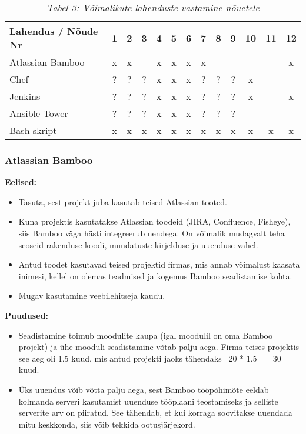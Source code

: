 \documentclass[12pt]{report}
\begin{document}
  \begin{table}
    \begin{tabular}{ |l|c|c|c|c|c|c|c|c|c|c|c|c| }
      \hline
      \textbf{Lahendus / Nõude Nr} & \textbf{1} & \textbf{2} & \textbf{3} & \textbf{4} & \textbf{5} & \textbf{6} & \textbf{7} & \textbf{8} & \textbf{9} & \textbf{10} & \textbf{11} & \textbf{12}\\
      \hline
      Atlassian Bamboo & x & x & & x & x & x & x & & & & & x\\
      \hline
      Chef & ? & ? & ? & x & x & x & ? & ? & ? & x & & \\
      \hline
      Jenkins & ? & ? & ? & x & x & x & ? & ? & ? & x & & x\\
      \hline
      Ansible Tower & ? & ? & ? & x & x & x & ? & ? & ? & & & \\
      \hline
      Bash skript & x & x & x & x & x & x & x & x & x & x & x & x\\
      \hline
    \end{tabular}
    \caption*{\textit{Tabel 3: Võimalikute lahenduste vastamine nõuetele}}
  \end{table}

  
  \subsubsection{Atlassian Bamboo}
  
  \textbf{Eelised:}
  \begin{itemize}
    \item Tasuta, sest projekt juba kasutab teised Atlassian tooted.
    \item Kuna projektis kasutatakse Atlassian toodeid (JIRA, Confluence, Fisheye), siis Bamboo väga hästi integreerub nendega. On võimalik mudagvalt teha seoseid rakenduse koodi, muudatuste kirjelduse ja uuenduse vahel.
    \item Antud toodet kasutavad teised projektid firmas, mis annab võimalust kaasata inimesi, kellel on olemas teadmised ja kogemus Bamboo seadistamise kohta.
    \item Mugav kasutamine veebilehitseja kaudu.
  \end{itemize}
  
  \textbf{Puudused:}
  \begin{itemize}
    \item Seadistamine toimub moodulite kaupa (igal moodulil on oma Bamboo projekt) ja ühe mooduli seadistamine võtab palju aega. Firma teises projektis see aeg oli 1.5 kuud, mis antud projekti jaoks tähendaks ~20 * 1.5 = ~30 kuud.
    \item Üks uuendus võib võtta palju aega, sest Bamboo tööpõhimõte eeldab kolmanda serveri kasutamist uuenduse tööplaani teostamiseks ja selliste serverite arv on piiratud. See tähendab, et kui korraga soovitakse uuendada mitu keskkonda, siis võib tekkida ootusjärjekord.
  \end{itemize}
  
\end{document}
